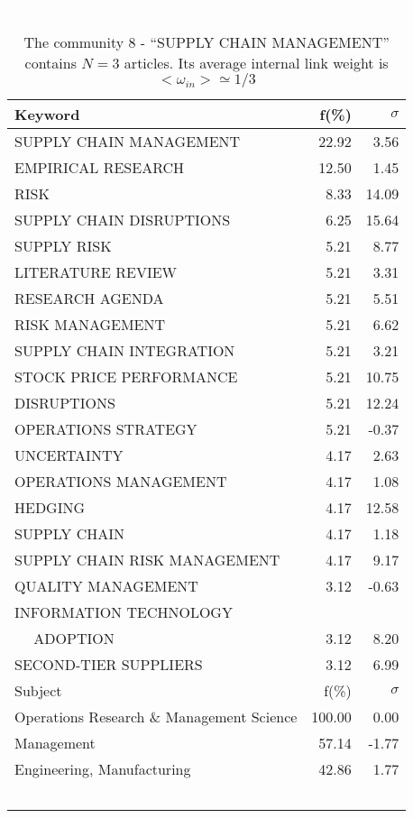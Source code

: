\documentclass[a4paper,11pt]{report}
\begin{document}
\begin{landscape}
\clearpage

\begin{table}[!ht]
\caption{The community 8 - ``SUPPLY CHAIN MANAGEMENT'' contains $N = 3$ articles. Its average internal link weight is $<\omega_{in}> \simeq 1/3$ }
\textcolor{white}{aa}\\
{\scriptsize\begin{tabular}{|l r r|}
\hline
Keyword & f(\%) & $\sigma$\\
\hline
SUPPLY CHAIN MANAGEMENT & 22.92 & 3.56\\
EMPIRICAL RESEARCH & 12.50 & 1.45\\
RISK & 8.33 & 14.09\\
SUPPLY CHAIN DISRUPTIONS & 6.25 & 15.64\\
SUPPLY RISK & 5.21 & 8.77\\
LITERATURE REVIEW & 5.21 & 3.31\\
RESEARCH AGENDA & 5.21 & 5.51\\
RISK MANAGEMENT & 5.21 & 6.62\\
SUPPLY CHAIN INTEGRATION & 5.21 & 3.21\\
STOCK PRICE PERFORMANCE & 5.21 & 10.75\\
DISRUPTIONS & 5.21 & 12.24\\
OPERATIONS STRATEGY & 5.21 & -0.37\\
UNCERTAINTY & 4.17 & 2.63\\
OPERATIONS MANAGEMENT & 4.17 & 1.08\\
HEDGING & 4.17 & 12.58\\
SUPPLY CHAIN & 4.17 & 1.18\\
SUPPLY CHAIN RISK MANAGEMENT & 4.17 & 9.17\\
QUALITY MANAGEMENT & 3.12 & -0.63\\
INFORMATION TECHNOLOGY &  & \\
$\quad$ ADOPTION & 3.12 & 8.20\\
SECOND-TIER SUPPLIERS & 3.12 & 6.99\\
\hline
\hline
Subject & f(\%) & $\sigma$\\
\hline
Operations Research \& Management Science & 100.00 & 0.00\\
Management & 57.14 & -1.77\\
Engineering, Manufacturing & 42.86 & 1.77\\
 &  & \\
 &  & \\
 &  & \\
 &  & \\
 &  & \\

\end{tabular}}
\end{table}
\end{landscape}
\end{document}

